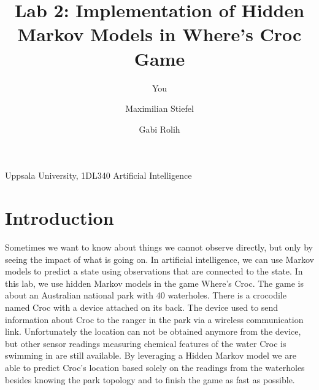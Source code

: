 \documentclass[a4paper]{article}
\title{Lab 2: Implementation of Hidden Markov Models in Where's Croc Game}
\author{You}
\author{
	Maximilian Stiefel
    \and
    Gabi Rolih
}
\begin{document}
\begin{flushright}
  Uppsala University,
  1DL340 Artificial Intelligence
\end{flushright}

\begingroup
\let\newpage\relax%
\maketitle
\endgroup


\section{Introduction}
Sometimes we want to know about things we cannot observe directly, but only by seeing the impact of what is going on. In artificial intelligence, we can use Markov models to predict a state using observations that are connected to the state. In this lab, we use hidden Markov models in the game Where's Croc. The game is about an Australian national park with 40 waterholes. There is a crocodile named Croc with a device attached on its back. The device used to send information about Croc to the ranger in the park via a wireless communication link. Unfortunately the location can not be obtained anymore from the device, but other sensor readings measuring chemical features of the water Croc is swimming in are still available. By leveraging a Hidden Markov model we are able to predict Croc's location based solely on the readings from the waterholes besides knowing the park topology and to finish the game as fast as possible. 
\end{document}
